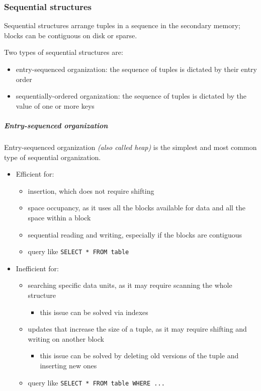\documentclass[english]{article}
\begin{document}
\subsubsection{Sequential structures}
Sequential structures arrange tuples in a sequence in the secondary memory;
blocks can be contiguous on disk or sparse.

Two types of sequential structures are:

\begin{itemize}
  \item entry-sequenced organization: the sequence of tuples is dictated by their entry order
  \item sequentially-ordered organization: the sequence of tuples is dictated by the value of one or more keys
\end{itemize}

\subparagraph*{Entry-sequenced organization} Entry-sequenced organization \textit{(also called heap)} is the simplest and most common type of sequential organization.

\begin{itemize}
  \item Efficient for:
        \begin{itemize}[label=\cmarkthin]
          \item insertion, which does not require shifting
          \item space occupancy, as it uses all the blocks available for data and all the space within a block
          \item sequential reading and writing, especially if the blocks are contiguous
          \item query like \texttt{SELECT * FROM table}
        \end{itemize}
  \item Inefficient for:
        \begin{itemize}[label=\xmarkthin]
          \item searching specific data units, as it may require scanning the whole structure
                \begin{itemize}[label=\(\rightarrow\)]
                  \item this issue can be solved via indexes
                \end{itemize}
          \item updates that increase the size of a tuple, as it may require shifting and writing on another block
                \begin{itemize}[label=\(\rightarrow\)]
                  \item this issue can be solved by deleting old versions of the tuple and inserting new ones
                \end{itemize}
          \item query like \texttt{SELECT * FROM table WHERE ...}
        \end{itemize}
\end{itemize}
\end{document}
